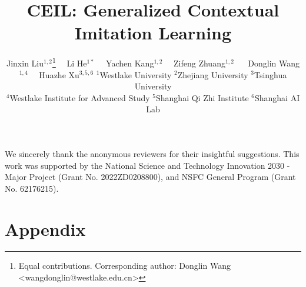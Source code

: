 \documentclass{article}
\title{CEIL: Generalized Contextual Imitation Learning}
\author{Jinxin Liu$^{1,2}$\thanks{Equal contributions. Corresponding author: Donglin Wang <wangdonglin@westlake.edu.cn>} 
\: \ \ 
Li He$^{1 *}$ \: \ \ 
Yachen Kang$^{1,2}$ \: \ \ 
Zifeng Zhuang$^{1,2}$ \: \ \ 
\AND 
Donglin Wang$^{1,4}$ \: \ \ 
Huazhe Xu$^{3,5,6}$
\AND 
\normalfont 
$^{1}$Westlake University \: 
$^{2}$Zhejiang University \: 
$^{3}$Tsinghua University \: \\
$^{4}$Westlake Institute for Advanced Study \: 
$^{5}$Shanghai Qi Zhi Institute  \: 
$^{6}$Shanghai AI Lab
}
\begin{document}
	
	
\maketitle
	
	





















\begin{ack}

We sincerely thank the anonymous reviewers for their insightful suggestions. 
This work was supported by the National Science and Technology Innovation 2030 - Major Project (Grant No. 2022ZD0208800), and NSFC General Program (Grant No. 62176215).



\end{ack}







\newpage 

\section*{Appendix}


\end{document}

